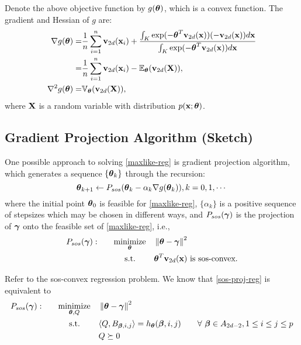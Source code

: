 \documentclass[11pt]{article}
\begin{document}
Denote the above objective function by $g({\boldsymbol\theta})$, which is a convex function. The gradient and Hessian of $g$ are:
\begin{align}
\nabla g({\boldsymbol\theta}) =& \frac{1}{n} \sum_{i = 1}^n {\bf v}_{2d}({\bf x}_i) + \frac{\int_ K\exp (-{\boldsymbol\theta}^T{\bf v}_{2d}({\bf x})) (-{\bf v}_{2d}({\bf x}) )d{\bf x} }{\int_K \exp (-{\boldsymbol\theta}^T{\bf v}_{2d}({\bf x})) d{\bf x}}\notag\\
=& \frac{1}{n} \sum_{i = 1}^n {\bf v}_{2d}({\bf x}_i) - \mathbb E_{\boldsymbol\theta} ({\bf v}_{2d}({\bf X})),\label{neg-loglike-gradient}\\
\nabla^2 g({\boldsymbol\theta}) =& \mathbb V_{\boldsymbol\theta} ({\bf v}_{2d}({\bf X})), \label{neg-loglike-hessian}
\end{align}
where ${\bf X}$ is a random variable with distribution $p({\bf x}; {\boldsymbol\theta})$.

\subsection{Gradient Projection Algorithm (Sketch)}


One possible approach to solving \eqref{maxlike-reg} is gradient projection algorithm, which generates a sequence $\{{\boldsymbol\theta}_k\}$ through the recursion:
\begin{equation} \label{gpa-recursion}
{\boldsymbol\theta}_{k + 1} \leftarrow P_{sos} ({\boldsymbol\theta}_k - \alpha_k \nabla g({\boldsymbol\theta}_k) ), k = 0, 1, \cdots
\end{equation}
where the initial point ${\boldsymbol\theta}_0$ is feasible for \eqref{maxlike-reg}, $\{\alpha_k\}$ is a positive sequence of stepsizes which may be chosen in different ways, and $P_{sos}({\boldsymbol\gamma})$ is the projection of ${\boldsymbol\gamma}$ onto the feasible set of \eqref{maxlike-reg}, i.e.,
\begin{equation} \label{sos-proj-reg}
\begin{aligned}
 P_{sos}({\boldsymbol\gamma}): \qquad & \underset{{\boldsymbol\theta}}{\text{minimize} }
& & \left\lVert {\boldsymbol\theta} - {\boldsymbol\gamma} \right\rVert^2 \\
& \text{\quad\ s.t.}
& & \text{${\boldsymbol\theta}^T {\bf v}_{2d}({\bf x})$ is sos-convex.}
\end{aligned}
\end{equation}

Refer to the sos-convex regression problem. We know that \eqref{sos-proj-reg} is equivalent to
\begin{equation} \label{sos-proj-reg2}
\begin{aligned}
 P_{sos}({\boldsymbol\gamma}): \qquad & \underset{{\boldsymbol\theta}, Q}{\text{minimize} }
& & \left\lVert {\boldsymbol\theta} - {\boldsymbol\gamma} \right\rVert^2 \\
& \text{\quad\ s.t.}
& & \langle{Q, B_{{\boldsymbol\beta}, i, j}} \rangle = h_{\boldsymbol\theta}({\boldsymbol\beta}, i, j) \qquad \forall\ {\boldsymbol\beta} \in A_{2d - 2}, 1 \le i \le j \le p \\
& & & Q \succeq 0 
\end{aligned}
\end{equation}
\end{document}
